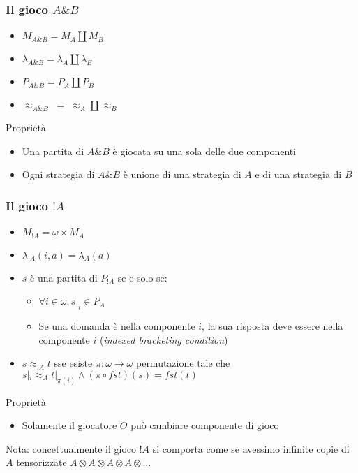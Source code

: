\documentclass{beamer}
\begin{document}
\begin{frame}
	
	\frametitle{Il gioco $A \& B$}
	
	\begin{itemize}
		\item $M_{A\& B}=M_A \coprod M_B$
		\item $\lambda_{A\& B}=\lambda_A \coprod \lambda_B$
		\item $P_{A\& B}=P_A \coprod P_B$
		\item $\approx_{A\& B} \; = \; \approx_A \coprod \approx_B$ 
	\end{itemize}
	
	\begin{block}{Proprietà}
		\begin{itemize}
			\item Una partita di $A\& B$ è giocata su una sola delle due componenti
			\item Ogni strategia di $A\& B$ è unione di una strategia di $A$ e di una strategia di $B$
		\end{itemize}
		
	\end{block}
	
\end{frame}

\begin{frame}
	
	\frametitle{Il gioco $!A$}
	
	\begin{itemize}
		\item $M_{!A}=\omega \times M_A$
		\item $\lambda_{!A}(i,a)=\lambda_A(a)$
		\item $s$ è una partita di $P_{!A}$ se e solo se:
		\begin{itemize}
			\item $\forall i\in \omega , s|_i \in P_A$
			\item Se una domanda è nella componente $i$, la sua risposta deve essere nella componente $i$ (\emph{indexed bracketing condition})
		\end{itemize}

		\item $s\approx_{!A} t$ sse esiste $\pi:\omega \rightarrow \omega$ permutazione tale che $s|_i \approx_A t|_{\pi(i)} \wedge (\pi \circ fst)(s)=fst(t)$
	\end{itemize}
	
	\begin{block}{Proprietà}
		\begin{itemize}
			\item Solamente il giocatore $O$ può cambiare componente di gioco
		\end{itemize}
	\end{block}
	
	Nota: concettualmente il gioco $!A$ si comporta come se avessimo infinite copie di $A$ tensorizzate $A\otimes A\otimes A\otimes A\otimes \dots$
	
\end{frame}
\end{document}
